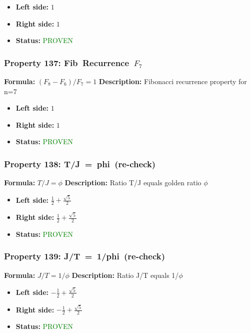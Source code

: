 \begin{itemize}
\item \textbf{Left side:} $1$
\item \textbf{Right side:} $1$
\item \textbf{Status:} \textcolor{green}{PROVEN}
\end{itemize}

\subsubsection*{Property 137: Fib~Recurrence~$F_{7}$}
\textbf{Formula:} $(F_8-F_6)/F_7=1$
\textbf{Description:} Fibonacci recurrence property for n=7

\begin{itemize}
\item \textbf{Left side:} $1$
\item \textbf{Right side:} $1$
\item \textbf{Status:} \textcolor{green}{PROVEN}
\end{itemize}

\subsubsection*{Property 138: T/J~=~phi~(re-check)}
\textbf{Formula:} $T/J = \phi$
\textbf{Description:} Ratio T/J equals golden ratio $\phi$

\begin{itemize}
\item \textbf{Left side:} $\frac{1}{2} + \frac{\sqrt{5}}{2}$
\item \textbf{Right side:} $\frac{1}{2} + \frac{\sqrt{5}}{2}$
\item \textbf{Status:} \textcolor{green}{PROVEN}
\end{itemize}

\subsubsection*{Property 139: J/T~=~1/phi~(re-check)}
\textbf{Formula:} $J/T = 1/\phi$
\textbf{Description:} Ratio J/T equals 1/$\phi$

\begin{itemize}
\item \textbf{Left side:} $- \frac{1}{2} + \frac{\sqrt{5}}{2}$
\item \textbf{Right side:} $- \frac{1}{2} + \frac{\sqrt{5}}{2}$
\item \textbf{Status:} \textcolor{green}{PROVEN}
\end{itemize}

